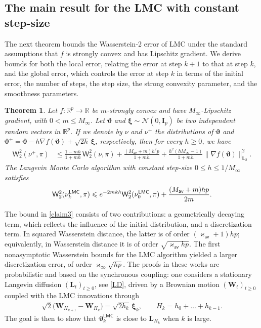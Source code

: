 \documentclass[aos,reqno]{imsart}
\newcommand\bL{\boldsymbol L}
\newcommand\bW{\boldsymbol W}
\newcommand\bxi{\boldsymbol\xi}
\newcommand\bvartheta{\boldsymbol\vartheta}
\def\wass{\mathsf{W}}
\def\kappav{\varkappa_{\textsf{av}}}
\def\kappamax{\varkappa_{\infty}}
\def\Mav{M_{\textsf{av}}}
\def\Mmax{M_{\infty}}
\newtheorem{theorem}{Theorem}
\theoremstyle{definition}
\begin{document}
\subsection{The main result for the LMC with 
constant step-size}

The next theorem bounds the Wasserstein-2 error of LMC 
under the standard assumptions that $f$ is strongly convex 
and has Lipschitz gradient. We derive bounds for
both the local error, relating the error at step $k+1$ to
that at step $k$, and the global error, which controls the
error at step $k$ in terms of the initial error, the number
of steps, the step size, the strong convexity parameter,
and the smoothness parameters.

\begin{theorem}\label{th:1}
    Let $f:\mathbb R^p\to\mathbb R$ be $m$-strongly convex 
    and have $\Mmax$-Lipschitz gradient, with $0<m\leqslant 
    \Mmax$. Let $\bvartheta$ and $\bxi\sim \mathcal N(0,\mathbf 
    I_p)$ be two independent random vectors in $\mathbb R^p$. 
    If we denote by $\nu$ and $\nu^+$ the distributions of 
    $\bvartheta$ and $\bvartheta^+ =\bvartheta - h\nabla f 
    (\bvartheta) + \sqrt{2h}\,\bxi$, respectively, then for 
    every $h\geqslant 0$, we have
    \begin{align}
        \wass_2^2(\nu^+, \pi)  &\leqslant 
        \frac{1-mh}{1+mh}\,\wass_2^2(\nu, \pi) 
        + \frac{(\Mav+m)h^2p}{1+mh} + \frac{h^2(h\Mmax-1)}
        {1+mh}\|\nabla f(\bvartheta)\|_{
        \mathbb L_2}^2.\label{claim1}
    \end{align}
    The Langevin Monte Carlo algorithm with constant step-size
    $0\leqslant h\leqslant 1/\Mmax$ satisfies
    \begin{align}\label{claim3}
        \wass_2^2(\nu^{\sf LMC}_{k}, \pi) 
        \leqslant e^{-2mkh}\wass_2^2(\nu^{\sf LMC}_0, \pi) +
        \frac{(\Mav+m)hp}{2m}.
    \end{align}
\end{theorem}

The bound in \eqref{claim3} consists of two contributions:
a geometrically decaying term, which reflects the influence of
the initial distribution, and a discretization term. In squared
Wasserstein distance, the latter is of order $(\kappav+1)hp$;
equivalently, in Wasserstein distance it is of order
$\sqrt{\kappav hp}$. The first nonasymptotic Wasserstein 
bounds for the LMC algorithm 
\cite{DalalyanColt,dalalyan2019user,durmus2019}
yielded a larger discretization error, of order $\kappamax
\sqrt{hp}$. The proofs in these works are probabilistic 
and based on the synchronous coupling: one considers a
stationary Langevin diffusion  $(\bL_t)_{t\geqslant0}$, 
see \eqref{LD},  driven by a Brownian motion $(\bW_t)_{ 
t\geqslant0}$ coupled with the LMC innovations through
\begin{align}
    \sqrt{2}\big(\bW_{H_{k+1}}-\bW_{H_k}\big)
    = \sqrt{2h_k}\,\bxi_k,
    \qquad
    H_k = h_0+\ldots+h_{k-1}.    
\end{align}
The goal is then to show that $\bvartheta_k^{\textsf{LMC}}$
is close to $\bL_{H_k}$ when $k$ is large.
\end{document}

